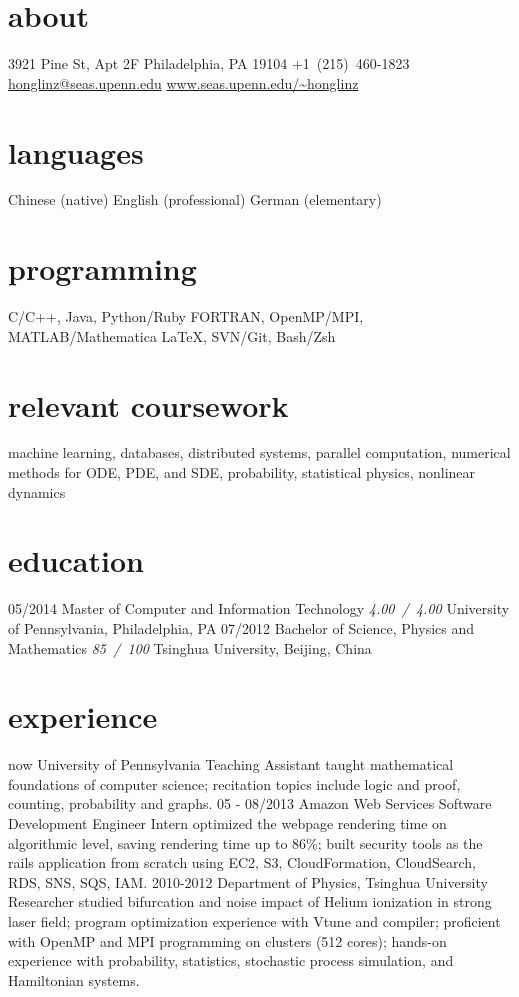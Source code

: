 \documentclass[]{friggeri-cv}
\begin{document}
{}

\begin{aside}
  \section{about}
  3921 Pine St, Apt 2F
  Philadelphia, PA
  19104
  +1~(215)~460-1823
  \href{mailto:honglinz@seas.upenn.edu}{honglinz@seas.upenn.edu}
  \href{http://www.seas.upenn.edu/~honglinz}{\url{www.seas.upenn.edu/~honglinz}}
  \section{languages}
  Chinese (native)
  English (professional)
  German (elementary)
  \section{programming}
  C/C++, Java, Python/Ruby
  FORTRAN, OpenMP/MPI, MATLAB/Mathematica
  \LaTeX, SVN/Git, Bash/Zsh
\end{aside}

\section{relevant coursework}
machine learning, databases, distributed systems, parallel computation, numerical methods for ODE, PDE, and SDE, probability, statistical physics, nonlinear dynamics
\section{education}

\begin{entrylist}
  \entry
    {05/2014}
    {Master of Computer and Information Technology}
    {\emph{4.00~/~4.00}}
    {University of Pennsylvania, Philadelphia, PA}
  \entry
    {07/2012}
    {Bachelor of Science, Physics and Mathematics}
    {\emph{85~/~100}}
    {Tsinghua University, Beijing, China}
\end{entrylist}
\section{experience}
\begin{entrylist}
  \entry
  {now}
  {University of Pennsylvania}
  {Teaching Assistant}
  {taught mathematical foundations of computer science; recitation topics include logic and proof, counting, probability and graphs.}
  \entry
  {05 - 08/2013}
  {Amazon Web Services}
  {Software Development Engineer Intern}
  {optimized the webpage rendering time on algorithmic level, saving rendering time up to 86\%; built security tools as the rails application from scratch using EC2, S3, CloudFormation, CloudSearch, RDS, SNS, SQS, IAM.}
  \entry
  {2010-2012}
  {Department of Physics, Tsinghua University}
  {Researcher}
  {studied bifurcation and noise impact of Helium ionization in strong laser field; program optimization experience with Vtune and compiler; proficient with OpenMP and MPI programming on clusters (512 cores); hands-on experience with probability, statistics, stochastic process simulation, and Hamiltonian systems.}
\end{entrylist}
\end{document}
